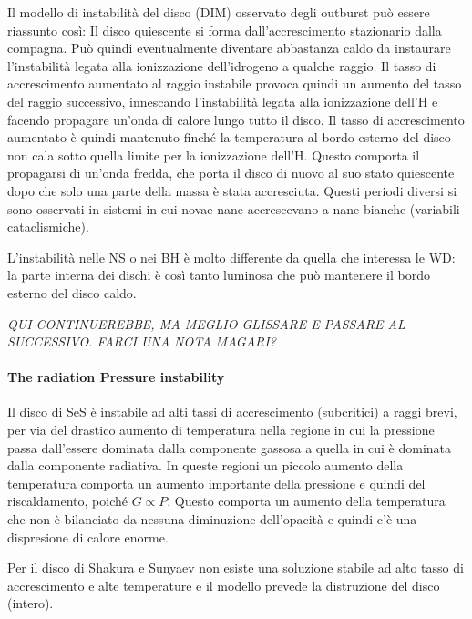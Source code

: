 \documentclass[a4paperbi]{article}
\begin{document}
	Il modello di instabilità del disco (DIM) osservato degli outburst può essere riassunto così: Il disco quiescente si forma dall'accrescimento stazionario dalla compagna. Può quindi eventualmente diventare abbastanza caldo da instaurare l'instabilità legata alla ionizzazione dell'idrogeno a qualche raggio. Il tasso di accrescimento aumentato al raggio instabile provoca quindi un aumento del tasso del raggio successivo, innescando l'instabilità legata alla ionizzazione dell'H e facendo propagare un'onda di calore lungo tutto il disco. Il tasso di accrescimento aumentato è quindi mantenuto finché la temperatura al bordo esterno del disco non cala sotto quella limite per la ionizzazione dell'H. Questo comporta il propagarsi di un'onda fredda, che porta il disco di nuovo al suo stato quiescente dopo che solo una parte della massa è stata accresciuta. Questi periodi diversi si sono osservati in sistemi in cui novae nane accrescevano a nane bianche (variabili cataclismiche).

	L'instabilità nelle NS o nei BH è molto differente da quella che interessa le WD: la parte interna dei dischi è così tanto luminosa che può mantenere il bordo esterno del disco caldo.

\emph{QUI CONTINUEREBBE, MA MEGLIO GLISSARE E PASSARE AL SUCCESSIVO. FARCI UNA NOTA MAGARI?}

\paragraph{The radiation Pressure instability}

	Il disco di SeS è instabile ad alti tassi di accrescimento (subcritici) a raggi brevi, per via del drastico aumento di temperatura nella regione in cui la pressione passa dall'essere dominata dalla componente gassosa a quella in cui è dominata dalla componente radiativa. In queste regioni un piccolo aumento della temperatura comporta un aumento importante della pressione e quindi del riscaldamento, poiché $G\propto P$. Questo comporta un aumento della temperatura che non è bilanciato da nessuna diminuzione dell'opacità e quindi c'è una dispresione di calore enorme.

	Per il disco di Shakura e Sunyaev non esiste una soluzione stabile ad alto tasso di accrescimento e alte temperature e il modello prevede la distruzione del disco (intero).
	
\end{document}
